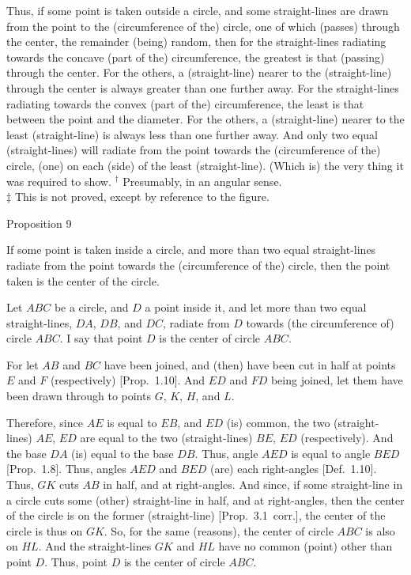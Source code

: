Thus, if some point is taken outside a circle, and some straight-lines are
drawn from the point to the (circumference of the) circle, one of which (passes) through the
center, the remainder  (being) random, then for the straight-lines
radiating towards the concave (part of the) circumference, the
greatest is  that (passing) through the center. For the others, a (straight-line)
nearer to the (straight-line) through the center is always greater than one
further away. For the straight-lines radiating towards the convex (part of
the) circumference, the least is that between the point and the
diameter. For the others, a (straight-line) nearer to the least
(straight-line) is always less than one further away. And only
two equal (straight-lines) will radiate from the point towards the (circumference of the) circle, (one) on each (side)
of the least (straight-line).  (Which is) the very thing it was required to show.
{\footnotesize \noindent$^\dag$ Presumably, in an angular sense.\\
$\ddag$  This is not
proved, except by reference to the figure.} 


\begin{center}
{\large Proposition 9}
\end{center}

If  some point is taken inside a circle, and more than two equal straight-lines
radiate from the point towards the (circumference of the) circle, then the
point taken  is the center of the circle.

Let $ABC$ be a circle, and $D$ a point inside it, and let more than two equal
straight-lines, $DA$, $DB$, and $DC$, radiate from $D$ towards (the circumference of) circle
$ABC$. I say that point $D$ is the center of circle $ABC$.

\epsfysize=2.2in
\centerline{}

For let $AB$ and $BC$ have been joined, and (then) have been cut in half at points $E$ and $F$ 
(respectively) [Prop.~1.10]. And $ED$ and $FD$ being joined, let them have been
drawn through to points $G$, $K$, $H$, and $L$.

Therefore, since $AE$ is equal to $EB$, and $ED$ (is) common, the two (straight-lines) $AE$, $ED$ are equal to the two (straight-lines) $BE$, $ED$ (respectively). And the 
base $DA$ (is) equal to the base $DB$. Thus, angle $AED$ is equal to
angle $BED$ [Prop.~1.8]. Thus, angles $AED$ and $BED$ (are) each right-angles [Def.~1.10]. Thus, $GK$ cuts $AB$ in half, and at right-angles. And since,
if some straight-line in a circle cuts some (other) straight-line in half,
and at right-angles, then the center of the circle is on the former (straight-line)
[Prop.~3.1~corr.], the center of the circle is thus on $GK$. So, for the
same (reasons), the center of circle $ABC$ is also on $HL$. And the straight-lines
$GK$ and $HL$ have no  common (point) other than point $D$. Thus, point
$D$ is the center of circle $ABC$.

